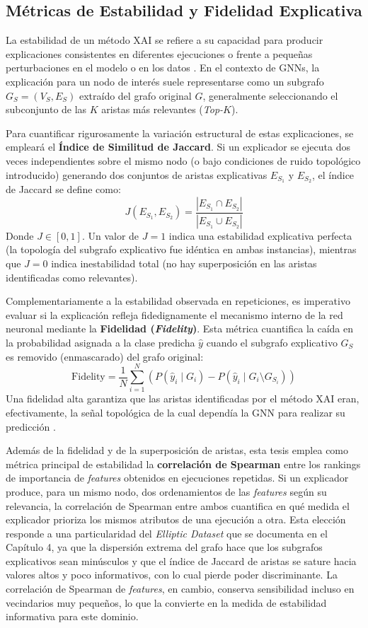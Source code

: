 \subsection{Métricas de Estabilidad y Fidelidad Explicativa}

La estabilidad de un método XAI se refiere a su capacidad para producir explicaciones consistentes en diferentes ejecuciones o frente a pequeñas perturbaciones en el modelo o en los datos \cite{Gawantka2024AExplanations}. En el contexto de GNNs, la explicación para un nodo de interés suele representarse como un subgrafo $G_S = (V_S, E_S)$ extraído del grafo original $G$, generalmente seleccionando el subconjunto de las $K$ aristas más relevantes (\textit{Top-$K$}).

Para cuantificar rigurosamente la variación estructural de estas explicaciones, se empleará el \textbf{Índice de Similitud de Jaccard}. Si un explicador se ejecuta dos veces independientes sobre el mismo nodo (o bajo condiciones de ruido topológico introducido) generando dos conjuntos de aristas explicativas $E_{S_1}$ y $E_{S_2}$, el índice de Jaccard se define como:
\[ J(E_{S_1}, E_{S_2}) = \frac{|E_{S_1} \cap E_{S_2}|}{|E_{S_1} \cup E_{S_2}|} \]
Donde $J \in [0, 1]$. Un valor de $J = 1$ indica una estabilidad explicativa perfecta (la topología del subgrafo explicativo fue idéntica en ambas instancias), mientras que $J = 0$ indica inestabilidad total (no hay superposición en las aristas identificadas como relevantes).

Complementariamente a la estabilidad observada en repeticiones, es imperativo evaluar si la explicación refleja fidedignamente el mecanismo interno de la red neuronal mediante la \textbf{Fidelidad (\textit{Fidelity})}. Esta métrica cuantifica la caída en la probabilidad asignada a la clase predicha $\hat{y}$ cuando el subgrafo explicativo $G_S$ es removido (enmascarado) del grafo original:
\[ \text{Fidelity} = \frac{1}{N} \sum_{i=1}^{N} \left( P(\hat{y}_i \mid G_i) - P(\hat{y}_i \mid G_i \setminus G_{S_i}) \right) \]
Una fidelidad alta garantiza que las aristas identificadas por el método XAI eran, efectivamente, la señal topológica de la cual dependía la GNN para realizar su predicción \cite{Agarwal2022ProbingMethods}.

Además de la fidelidad y de la superposición de aristas, esta tesis emplea como métrica principal de estabilidad la \textbf{correlación de Spearman} entre los rankings de importancia de \textit{features} obtenidos en ejecuciones repetidas. Si un explicador produce, para un mismo nodo, dos ordenamientos de las \textit{features} según su relevancia, la correlación de Spearman entre ambos cuantifica en qué medida el explicador prioriza los mismos atributos de una ejecución a otra. Esta elección responde a una particularidad del \textit{Elliptic Dataset} que se documenta en el Capítulo 4, ya que la dispersión extrema del grafo hace que los subgrafos explicativos sean minúsculos y que el índice de Jaccard de aristas se sature hacia valores altos y poco informativos, con lo cual pierde poder discriminante. La correlación de Spearman de \textit{features}, en cambio, conserva sensibilidad incluso en vecindarios muy pequeños, lo que la convierte en la medida de estabilidad informativa para este dominio.

